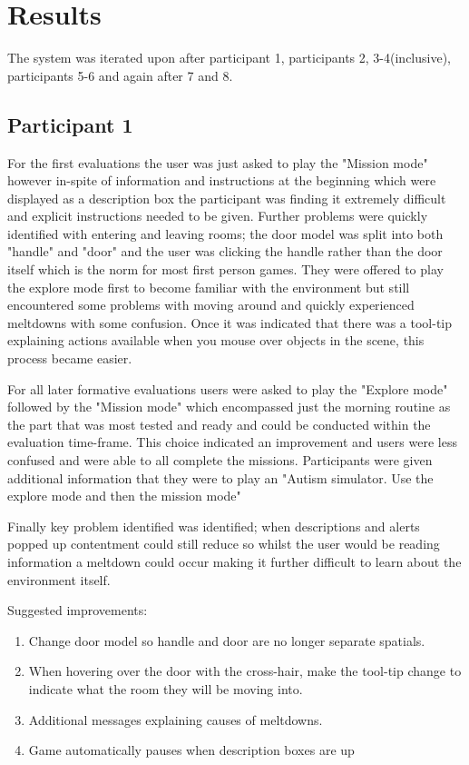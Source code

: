 \documentclass[11pt]{report}
\begin{document}
\section{Results}
The system was iterated upon after participant 1, participants 2, 3-4(inclusive), participants 5-6 and again after 7 and 8.

\subsection*{Participant 1}

For the first evaluations the user was just asked to play the "Mission mode" however in-spite of information and instructions at the beginning which were displayed as a description box the participant was finding it extremely difficult and explicit instructions needed to be given. Further problems were quickly identified with entering and leaving rooms; the door model was split into both "handle" and "door" and the user was clicking the handle rather than the door itself which is the norm for most first person games. They were offered to play the explore mode first to become familiar with the environment but still encountered some problems with moving around and quickly experienced meltdowns with some confusion. Once it was indicated that there was a tool-tip explaining actions available when you mouse over objects in the scene, this process became easier. 

For all later formative evaluations users were asked to play the "Explore mode" followed by the "Mission mode" which encompassed just the morning routine as the part that was most tested and ready and could be conducted within the evaluation time-frame. This choice indicated an improvement and users were less confused and were able to all complete the missions. Participants were given additional information that they were to play an "Autism simulator. Use the explore mode and then the mission mode"

Finally key problem identified  was identified; when descriptions and alerts popped up contentment could still reduce so whilst the user would be reading information a meltdown could occur making it further difficult to learn about the environment itself.

Suggested improvements:
\begin{enumerate}
\item Change door model so handle and door are no longer separate spatials. 
\item When hovering over the door with the cross-hair, make the tool-tip change to indicate what the room they will be moving into. 
\item Additional messages explaining causes of meltdowns.
\item Game automatically pauses when description boxes are up
\end{enumerate}
\end{document}
